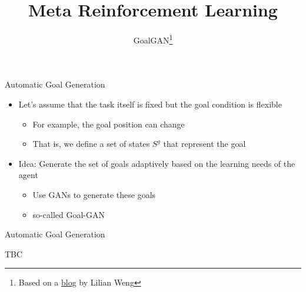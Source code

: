 


\title[Meta-RL]{Meta Reinforcement Learning}
\subtitle{GoalGAN\footnote{Based on a \href{https://lilianweng.github.io/lil-log/2020/01/29/curriculum-for-reinforcement-learning.html}{blog} by Lilian Weng}}



	
	\maketitle

\begin{frame}[c]{Automatic Goal Generation }
	
	\begin{itemize}
		\item Let's assume that the task itself is fixed but the goal condition is flexible
		\begin{itemize}
			\item For example, the goal position can change
			\item That is, we define a set of states $S^g$ that represent the goal
		\end{itemize}
		\pause
		\smallskip
		\item \alert{Idea:} Generate the set of goals adaptively based on the learning needs of the agent
		\begin{itemize}
			\item Use GANs to generate these goals
			\item so-called Goal-GAN
		\end{itemize}
	\end{itemize}
	
\end{frame}
\begin{frame}[c]{Automatic Goal Generation }
	
	TBC
	
\end{frame}


